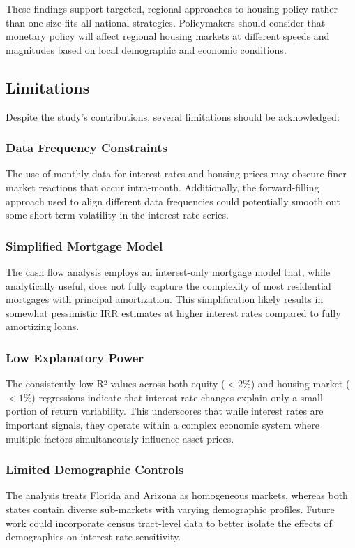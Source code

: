 \documentclass[12pt, stu, abstract]{apa7}
\begin{document}
These findings support targeted, regional approaches to housing policy rather than one-size-fits-all national strategies. Policymakers should consider that monetary policy will affect regional housing markets at different speeds and magnitudes based on local demographic and economic conditions.

\subsection{Limitations}
Despite the study's contributions, several limitations should be acknowledged:

\subsubsection{Data Frequency Constraints}
The use of monthly data for interest rates and housing prices may obscure finer market reactions that occur intra-month. Additionally, the forward-filling approach used to align different data frequencies could potentially smooth out some short-term volatility in the interest rate series.

\subsubsection{Simplified Mortgage Model}
The cash flow analysis employs an interest-only mortgage model that, while analytically useful, does not fully capture the complexity of most residential mortgages with principal amortization. This simplification likely results in somewhat pessimistic IRR estimates at higher interest rates compared to fully amortizing loans.

\subsubsection{Low Explanatory Power}
The consistently low R² values across both equity ($< 2\%$) and housing market ($< 1\%$) regressions indicate that interest rate changes explain only a small portion of return variability. This underscores that while interest rates are important signals, they operate within a complex economic system where multiple factors simultaneously influence asset prices.

\subsubsection{Limited Demographic Controls}
The analysis treats Florida and Arizona as homogeneous markets, whereas both states contain diverse sub-markets with varying demographic profiles. Future work could incorporate census tract-level data to better isolate the effects of demographics on interest rate sensitivity.
\end{document}
